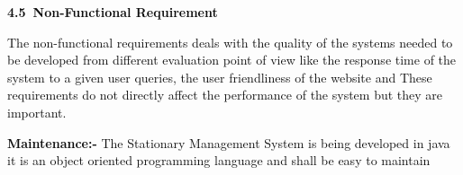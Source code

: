 \documentclass[12pt]{report}
\renewcommand{\_}{\kern-1.5pt\textunderscore\kern-1.5pt}
\begin{document}
\vspace{\baselineskip}
\begin{adjustwidth}{0.2in}{0.84in}
\begin{justify}
\textbf{\textcolor[HTML]{0D0D0D}{4.5\  Non-Functional Requirement}}
\end{justify}\par

\end{adjustwidth}


\vspace{\baselineskip}
\begin{adjustwidth}{0.2in}{0.84in}
\begin{justify}
\textcolor[HTML]{0D0D0D}{The non-functional requirements deals with the quality of the systems needed to be developed from different evaluation point of view like the response time of the system to a given user queries, the user friendliness of the website and These requirements do not directly affect the performance of the system but they are important.}
\end{justify}\par

\end{adjustwidth}

\begin{adjustwidth}{0.2in}{0.84in}
\begin{justify}
\textcolor[HTML]{0D0D0D}{ }
\end{justify}\par

\end{adjustwidth}

\begin{adjustwidth}{0.2in}{0.84in}
\begin{justify}
\textcolor[HTML]{0D0D0D}{ }
\end{justify}\par

\end{adjustwidth}

\begin{adjustwidth}{0.2in}{0.84in}
\begin{justify}
\textbf{\textcolor[HTML]{0D0D0D}{Maintenance:-}}\textcolor[HTML]{0D0D0D}{ The Stationary Management System is being developed in java it is an object oriented programming language and shall be easy to maintain}
\end{justify}\par

\end{adjustwidth}
\end{document}
